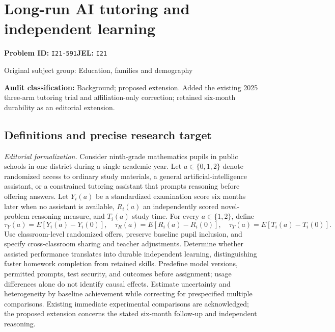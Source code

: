 \documentclass[11pt,a4paper]{article}
\begin{document}
\section*{Long-run AI tutoring and independent learning}
\textbf{Problem ID:} \texttt{I21-591}\quad \textbf{JEL:} \texttt{I21}\par
\label{problem:OP-0453}
\label{audited:ECON-043}
{\sffamily\small\color{muted}Original subject group: Education, families and demography\par}
\label{definitions:problem:30007735}
\textbf{Audit classification:} Background; proposed extension. Added the existing 2025 three-arm tutoring trial and affiliation-only correction; retained six-month durability as an editorial extension.
\subsection*{Definitions and precise research target}
\textit{Editorial formalization.} Consider ninth-grade mathematics pupils in public schools in one district during a single academic year. Let \(a\in\{0,1,2\}\) denote randomized access to ordinary study materials, a general artificial-intelligence assistant, or a constrained tutoring assistant that prompts reasoning before offering answers. Let \(Y_i(a)\) be a standardized examination score six months later when no assistant is available, \(R_i(a)\) an independently scored novel-problem reasoning measure, and \(T_i(a)\) study time. For every \(a\in\{1,2\}\), define
\[\tau_Y(a)=E[Y_i(a)-Y_i(0)],\quad\tau_R(a)=E[R_i(a)-R_i(0)],\quad\tau_T(a)=E[T_i(a)-T_i(0)].\]
Use classroom-level randomized offers, preserve baseline pupil inclusion, and specify cross-classroom sharing and teacher adjustments. Determine whether assisted performance translates into durable independent learning, distinguishing faster homework completion from retained skills. Predefine model versions, permitted prompts, test security, and outcomes before assignment; usage differences alone do not identify causal effects. Estimate uncertainty and heterogeneity by baseline achievement while correcting for prespecified multiple comparisons. Existing immediate experimental comparisons are acknowledged; the proposed extension concerns the stated six-month follow-up and independent reasoning.
\end{document}
